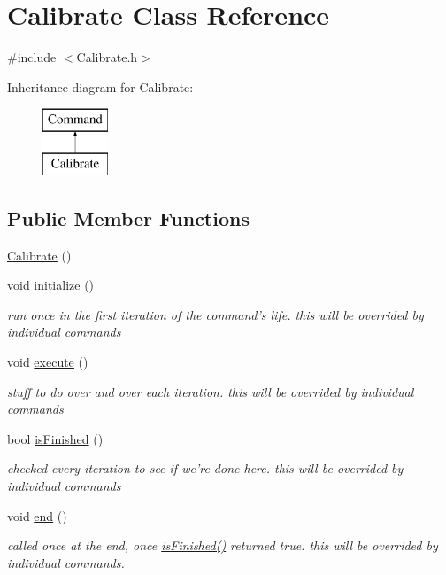 \hypertarget{classCalibrate}{\section{Calibrate Class Reference}
\label{classCalibrate}
}


{\ttfamily \#include $<$Calibrate.\-h$>$}

Inheritance diagram for Calibrate\-:\begin{figure}[H]
\begin{center}
\leavevmode
\includegraphics[height=2.000000cm]{classCalibrate}
\end{center}
\end{figure}
\subsection*{Public Member Functions}
\begin{DoxyCompactItemize}
\item 
\hyperlink{classCalibrate_af7fd8ee2339ee66f6f8e4d9953025796}{Calibrate} ()
\item 
void \hyperlink{classCalibrate_a67ac70871401c5b6e74fa92fa4b57f1e}{initialize} ()
\begin{DoxyCompactList}\small\item\em run once in the first iteration of the command's life. this will be overrided by individual commands \end{DoxyCompactList}\item 
void \hyperlink{classCalibrate_ac4d34bf2f831065219b7a930b0389b6e}{execute} ()
\begin{DoxyCompactList}\small\item\em stuff to do over and over each iteration. this will be overrided by individual commands \end{DoxyCompactList}\item 
bool \hyperlink{classCalibrate_afb77ae82fa06d139612f11dec7b6ed5f}{is\-Finished} ()
\begin{DoxyCompactList}\small\item\em checked every iteration to see if we're done here. this will be overrided by individual commands \end{DoxyCompactList}\item 
void \hyperlink{classCalibrate_a2ea8ff643d8450473d6245e407415f03}{end} ()
\begin{DoxyCompactList}\small\item\em called once at the end, once \hyperlink{classCalibrate_afb77ae82fa06d139612f11dec7b6ed5f}{is\-Finished()} returned true. this will be overrided by individual commands. \end{DoxyCompactList}\end{DoxyCompactItemize}
